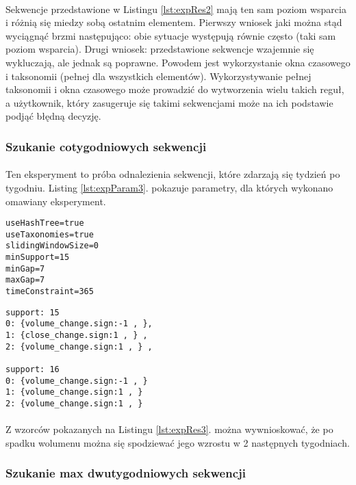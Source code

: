 \documentclass[11pt,a4paper]{article}
\begin{document}
\paragraph{}Sekwencje przedstawione w Listingu \ref{lst:expRes2} mają ten sam poziom wsparcia i różnią się miedzy sobą ostatnim elementem. Pierwszy wniosek jaki można stąd wyciągnąć brzmi następująco: obie sytuacje występują równie często (taki sam poziom wsparcia). Drugi wniosek: przedstawione sekwencje wzajemnie się wykluczają, ale jednak są poprawne. Powodem jest wykorzystanie okna czasowego i taksonomii (pełnej dla wszystkich elementów). Wykorzystywanie pełnej taksonomii i okna czasowego może prowadzić do wytworzenia wielu takich reguł, a użytkownik, który zasugeruje się takimi sekwencjami może na ich podstawie podjąć błędną decyzję. 

\subsubsection{Szukanie cotygodniowych sekwencji}
\paragraph{}Ten eksperyment to próba odnalezienia sekwencji, które zdarzają się tydzień po tygodniu. Listing \ref{lst:expParam3}. pokazuje parametry, dla których wykonano omawiany eksperyment.
\begin{lstlisting}[caption={Parametry, eksperyment 3},label={lst:expParam3}]
useHashTree=true
useTaxonomies=true
slidingWindowSize=0
minSupport=15
minGap=7
maxGap=7
timeConstraint=365
\end{lstlisting}
\begin{lstlisting}[caption={Wzorce, eksperyment 3},label={lst:expRes3}]
support: 15
0: {volume_change.sign:-1 , },
1: {close_change.sign:1 , } ,
2: {volume_change.sign:1 , } ,

support: 16
0: {volume_change.sign:-1 , }
1: {volume_change.sign:1 , }
2: {volume_change.sign:1 , } 
\end{lstlisting}
\paragraph{}Z wzorców pokazanych na Listingu \ref{lst:expRes3}. można wywnioskować, że po spadku wolumenu można się spodziewać jego wzrostu w 2 następnych tygodniach.

\subsubsection{Szukanie max dwutygodniowych sekwencji}
\end{document}
